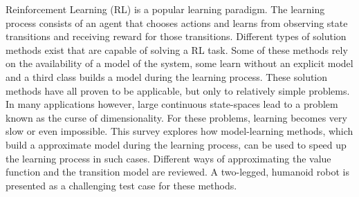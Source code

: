 \documentclass[a4paper,11pt]{mscLiterature}
\begin{document}
%
\frontmatter %
%
    \maketitle
%


Reinforcement Learning (RL) is a popular learning paradigm. The learning process consists of an agent that chooses 	actions and learns from observing state transitions and receiving reward for those transitions. Different types of solution methods exist that are capable of solving a RL task. Some of these methods rely on the availability of a model of the system, some learn without an explicit model and a third class builds a model during the learning process. These solution methods have all proven to be applicable, but only to relatively simple problems. In many applications however, large continuous state-spaces lead to a problem known as the curse of dimensionality. For these problems, learning becomes very slow or even impossible. This survey explores how model-learning methods, which build a approximate model during the learning process, can be used to speed up the learning process in such cases. Different ways of approximating the value function and the transition model are reviewed. A two-legged, humanoid robot is presented as a challenging test case for these methods. 
\end{document}
